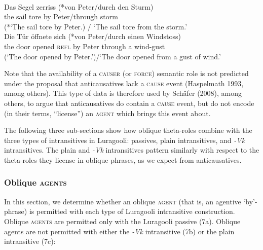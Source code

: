 \documentclass[output=paper]{langsci/langscibook}
\begin{document}
\ex\label{ex:}
\\
\gll   Das Segel zerriss (*von Peter/durch den Sturm)\\
       the  sail    tore        by    Peter/through storm\\
\glt (*‘The sail tore by Peter.) / ‘The sail tore from the storm.’
\ex\label{ex:}
\\
\gll   Die Tür   öffnete sich (*von Peter/durch einen Windstoss)\\
       the door opened \textsc{refl}  by   Peter  through a wind-gust\\
\glt (‘The door opened by Peter.’)/‘The door opened from a gust of wind.’
\z
\z

Note that the availability of a \textsc{causer} (or \textsc{force}) semantic role is not predicted under the proposal that anticausatives lack a\textsc{ cause }event (Haspelmath 1993, among others). This type of data is therefore used by Schäfer (2008), among others, to argue that anticausatives do contain a \textsc{cause} event, but do not encode (in their terms, “license”) an \textsc{agent} which brings this event about. 

The following three sub-sections show how oblique theta-roles combine with the three types of intransitives in Luragooli: passives, plain intransitives, and \textit{-Vk} intransitives. The plain and \textit{-Vk} intransitives pattern similarly with respect to the theta-roles they license in oblique phrases, as we expect from anticausatives.

\subsubsection{Oblique \textsc{agents} }

In this section, we determine whether an oblique \textsc{agent} (that is, an agentive ‘by’-phrase) is permitted with each type of Luragooli intransitive construction. Oblique \textsc{agents} are permitted only with the Luragooli passive (7a). Oblique agents are not permitted with either the \textit{-Vk} intransitive (7b) or the plain intransitive (7c):
\end{document}
